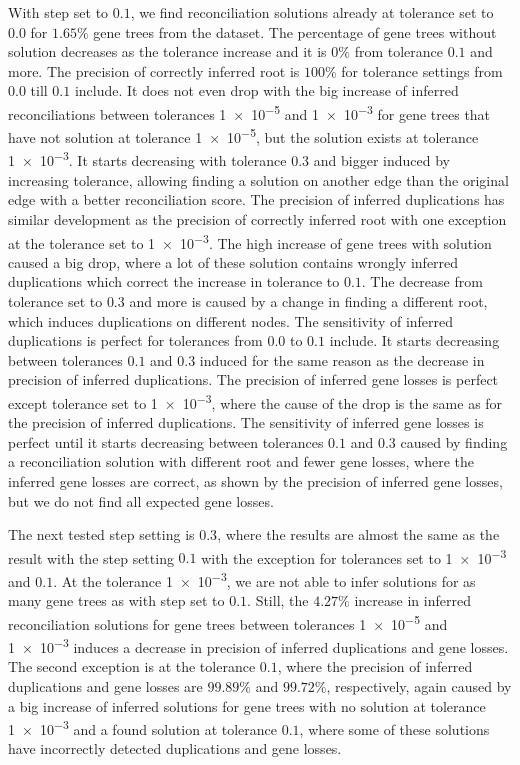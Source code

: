With step set to $0.1$, we find reconciliation solutions already at tolerance set to $0.0$ for $1.65\%$ gene trees from the dataset. The percentage of gene trees without solution decreases as the tolerance increase and it is $0\%$ from tolerance $0.1$ and more. The precision of correctly inferred root is $100\%$ for tolerance settings from $0.0$ till $0.1$ include. It does not even drop with the big increase of inferred reconciliations between tolerances \num{1e-5} and \num{1e-3} for gene trees that have not solution at tolerance \num{1e-5}, but the solution exists at tolerance \num{1e-3}. It starts decreasing with tolerance $0.3$ and bigger induced by increasing tolerance, allowing finding a solution on another edge than the original edge with a better reconciliation score. The precision of inferred duplications has similar development as the precision of correctly inferred root with one exception at the tolerance set to \num{1e-3}. The high increase of gene trees with solution caused a big drop, where a lot of these solution contains wrongly inferred duplications which correct the increase in tolerance to $0.1$. The decrease from tolerance set to $0.3$ and more is caused by a change in finding a different root, which induces duplications on different nodes. The sensitivity of inferred duplications is perfect for tolerances from $0.0$ to $0.1$ include. It starts decreasing between tolerances $0.1$ and $0.3$ induced for the same reason as the decrease in precision of inferred duplications. The precision of inferred gene losses is perfect except tolerance set to \num{1e-3}, where the cause of the drop is the same as for the precision of inferred duplications. The sensitivity of inferred gene losses is perfect until it starts decreasing between tolerances $0.1$ and $0.3$ caused by finding a reconciliation solution with different root and fewer gene losses, where the inferred gene losses are correct, as shown by the precision of inferred gene losses, but we do not find all expected gene losses.

The next tested step setting is $0.3$, where the results are almost the same as the result with the step setting $0.1$ with the exception for tolerances set to \num{1e-3} and $0.1$. At the tolerance \num{1e-3}, we are not able to infer solutions for as many gene trees as with step set to $0.1$. Still, the $4.27\%$ increase in inferred reconciliation solutions for gene trees between tolerances \num{1e-5} and \num{1e-3} induces a decrease in precision of inferred duplications and gene losses. The second exception is at the tolerance $0.1$, where the precision of inferred duplications and gene losses are $99.89\%$ and $99.72\%$, respectively, again caused by a big increase of inferred solutions for gene trees with no solution at tolerance \num{1e-3} and a found solution at tolerance $0.1$, where some of these solutions have incorrectly detected duplications and gene losses.

